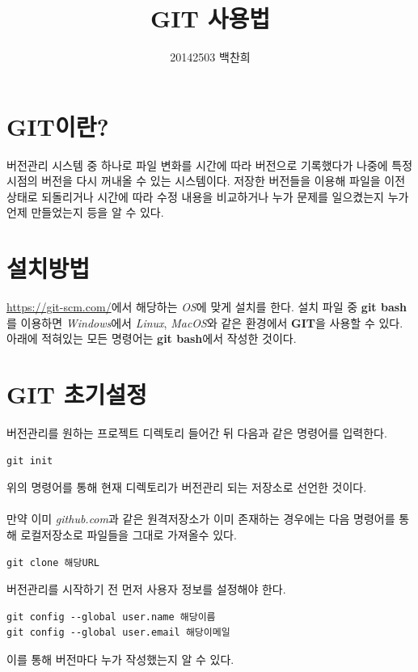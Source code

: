 \documentclass[letterpaper,12pt]{article}
\begin{document}
\title{GIT 사용법}
\author{20142503 백찬희}

\maketitle

\section{GIT이란?}
버전관리 시스템 중 하나로 파일 변화를 시간에 따라 버전으로 기록했다가 나중에 특정 시점의 버전을 다시 꺼내올 수 있는 시스템이다. 
저장한 버전들을 이용해 파일을 이전 상태로 되돌리거나 시간에 따라 수정 내용을 비교하거나 누가 문제를 일으켰는지 누가 언제 만들었는지 등을 알 수 있다. 

\section{설치방법}
\href{https://git-scm.com/}{https://git-scm.com/}에서 해당하는 \textit{OS}에 맞게 설치를 한다. 설치 파일 중 \textbf{git bash}를 이용하면 \textit{Windows}에서 \textit{Linux}, \textit{MacOS}와 같은 환경에서 \textbf{GIT}을 사용할 수 있다. 아래에 적혀있는 모든 명령어는 \textbf{git bash}에서 작성한 것이다.

\section{GIT 초기설정}
버전관리를 원하는 프로젝트 디렉토리 들어간 뒤 다음과 같은 명령어를 입력한다.
\begin{verbatim}
git init
\end{verbatim} 
위의 명령어를 통해 현재 디렉토리가 버전관리 되는 저장소로 선언한 것이다.
\\\\
만약 이미 \textit{github.com}과 같은 원격저장소가 이미 존재하는 경우에는 다음 명령어를 통해 로컬저장소로 파일들을 그대로 가져올수 있다.
\begin{verbatim}
git clone 해당URL
\end{verbatim} 
버전관리를 시작하기 전 먼저 사용자 정보를 설정해야 한다. 
\begin{verbatim}
git config --global user.name 해당이름
git config --global user.email 해당이메일
\end{verbatim} 
이를 통해 버전마다 누가 작성했는지 알 수 있다.

\clearpage
\end{document}
